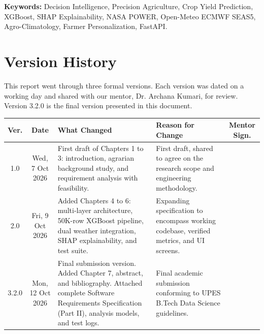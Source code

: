 \documentclass[11pt,a4paper]{report}
\begin{document}
\noindent
\textbf{Keywords:} Decision Intelligence, Precision Agriculture, Crop Yield Prediction, XGBoost, SHAP Explainability, NASA POWER, Open-Meteo ECMWF SEAS5, Agro-Climatology, Farmer Personalization, FastAPI.

\newpage

\chapter*{Version History}

This report went through three formal versions. Each version was dated on a working day and shared with our mentor, Dr. Archana Kumari, for review. Version 3.2.0 is the final version presented in this document.\\[4mm]

\noindent
\begin{tabularx}{\textwidth}{|c|c|X|X|c|}
\hline
\textbf{Ver.} & \textbf{Date} & \textbf{What Changed} & \textbf{Reason for Change} & \textbf{Mentor Sign.} \\
\hline
1.0 & Wed, 7 Oct 2026 & First draft of Chapters 1 to 3: introduction, agrarian background study, and requirement analysis with feasibility. & First draft, shared to agree on the research scope and engineering methodology. & \\
\hline
2.0 & Fri, 9 Oct 2026 & Added Chapters 4 to 6: multi-layer architecture, 50K-row XGBoost pipeline, dual weather integration, SHAP explainability, and test suite. & Expanding specification to encompass working codebase, verified metrics, and UI screens. & \\
\hline
3.2.0 & Mon, 12 Oct 2026 & Final submission version. Added Chapter 7, abstract, and bibliography. Attached complete Software Requirements Specification (Part II), analysis models, and test logs. & Final academic submission conforming to UPES B.Tech Data Science guidelines. & \\
\hline
\end{tabularx}
\end{document}
